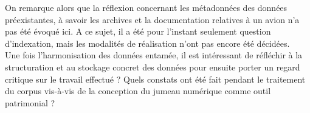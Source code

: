 On remarque alors que la réflexion concernant les métadonnées des données préexistantes, à savoir les archives et la documentation relatives à un avion n’a pas été évoqué ici. A ce sujet, il a été pour l’instant seulement question d’indexation, mais les modalités de réalisation n’ont pas encore été décidées.\\

Une fois l'harmonisation des données entamée, il est intéressant de réfléchir à la structuration et au stockage concret des données pour ensuite porter un regard critique sur le travail effectué ? Quels constats ont été fait pendant le traitement du corpus vis-à-vis de la conception du jumeau numérique comme outil patrimonial ?